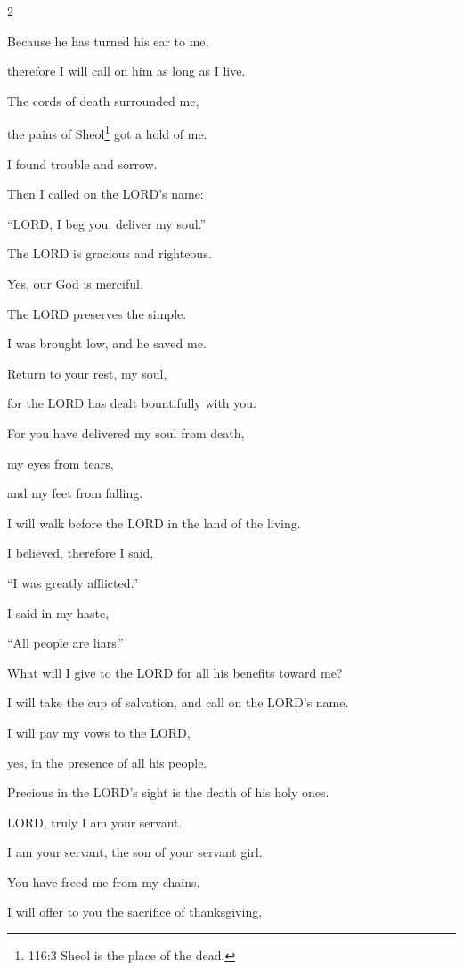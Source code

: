 \begin{multicols}{2}
	
	\myverse{}Because he has turned his ear to me,
	
	therefore I will call on him as long as I live.
	
	
	\myverse{}The cords of death surrounded me,
	
	the pains of Sheol\footnote{116:3 Sheol is the place of the dead.} got a hold of me.
	
	I found trouble and sorrow.
	
	
	\myverse{}Then I called on the LORD’s name:
	
	“LORD, I beg you, deliver my soul.”
	
	
	\myverse{}The LORD is gracious and righteous.
	
	Yes, our God is merciful.
	
	
	\myverse{}The LORD preserves the simple.
	
	I was brought low, and he saved me.
	
	
	\myverse{}Return to your rest, my soul,
	
	for the LORD has dealt bountifully with you.
	
	
	\myverse{}For you have delivered my soul from death,
	
	my eyes from tears,
	
	and my feet from falling.
	
	
	\myverse{}I will walk before the LORD in the land of the living.
	
	
	\myverse{}I believed, therefore I said,
	
	“I was greatly afflicted.”
	
	
	\myverse{}I said in my haste,
	
	“All people are liars.”
	
	
	\myverse{}What will I give to the LORD for all his benefits toward me?
	
	
	\myverse{}I will take the cup of salvation, and call on the
	LORD’s name.
	
	
	\myverse{}I will pay my vows to the LORD,
	
	yes, in the presence of all his people.
	
	
	\myverse{}Precious in the LORD’s sight is the death of his holy ones.
	
	
	\myverse{}LORD, truly I am your servant.
	
	I am your servant, the son of your servant girl.
	
	You have freed me from my chains.
	
	
	\myverse{}I will offer to you the sacrifice of thanksgiving,
	

\end{multicols}
